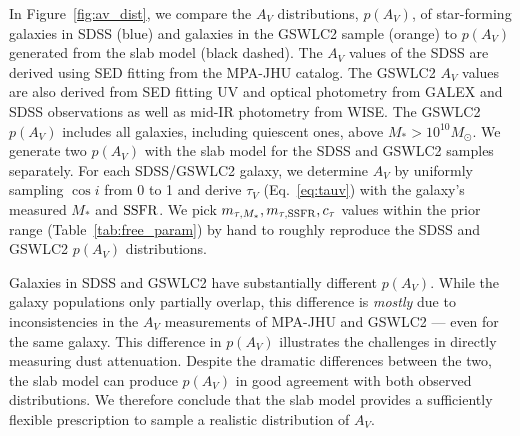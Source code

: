 In Figure~\ref{fig:av_dist}, we compare the $A_V$ distributions, $p(A_V)$,
of star-forming galaxies in SDSS (blue) and galaxies in the
\cite{salim2018} GSWLC2 sample (orange) to $p(A_V)$ generated from the
slab model (black dashed). 
The $A_V$ values of the SDSS are derived using SED fitting from the
\cite{brinchmann2004} MPA-JHU catalog.
The GSWLC2 $A_V$ values are also derived from SED fitting UV and optical
photometry from GALEX and SDSS observations as well as mid-IR photometry from WISE. 
The GSWLC2 $p(A_V)$ includes all galaxies, including quiescent ones, above
$M_* > 10^{10}M_\odot$. 
We generate two $p(A_V)$ with the slab model for the SDSS and GSWLC2
samples separately.
For each SDSS/GSWLC2 galaxy, we determine $A_V$ by uniformly sampling 
$\cos i$ from 0 to 1 and derive $\tau_V$ (Eq.~\ref{eq:tauv}) with the
galaxy's measured $M_*$ and ${\rm SSFR}$. 
We pick $m_{\tau,M_*}, m_{\tau,{\rm SSFR}}, c_\tau$ values within the prior range
(Table~\ref{tab:free_param}) by hand to roughly reproduce the SDSS and GSWLC2 $p(A_V)$
distributions. 

Galaxies in SDSS and GSWLC2 have substantially different $p(A_V)$. 
While the galaxy populations only partially overlap, this difference is 
{\em mostly} due to inconsistencies in the $A_V$ measurements of MPA-JHU and GSWLC2 --- even
for the same galaxy.
This difference in $p(A_V)$ illustrates the challenges in directly measuring
dust attenuation. 
Despite the dramatic differences between the two, the slab model can
produce $p(A_V)$ in good agreement with both observed distributions. 
We therefore conclude that the slab model provides a sufficiently flexible
prescription to sample a realistic distribution of $A_V$. 

